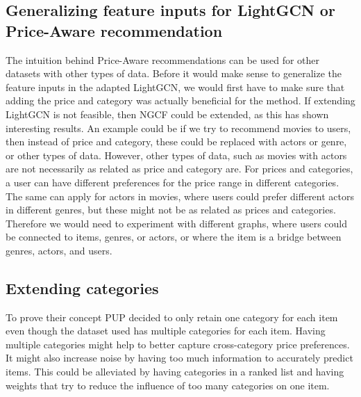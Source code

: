 \subsection{Generalizing feature inputs for LightGCN or Price-Aware recommendation}
The intuition behind Price-Aware recommendations can be used for other datasets with other types of data.
Before it would make sense to generalize the feature inputs in the adapted LightGCN, we would first have to make sure that adding the price and category was actually beneficial for the method.
If extending LightGCN is not feasible, then NGCF could be extended, as this has shown interesting results.
An example could be if we try to recommend movies to users, then instead of price and category, these could be replaced with actors or genre, or other types of data.
However, other types of data, such as movies with actors are not necessarily as related as price and category are.
For prices and categories, a user can have different preferences for the price range in different categories.
The same can apply for actors in movies, where users could prefer different actors in different genres, but these might not be as related as prices and categories.
Therefore we would need to experiment with different graphs, where users could be connected to items, genres, or actors, or where the item is a bridge between genres, actors, and users.

\subsection{Extending categories}
To prove their concept PUP decided to only retain one category for each item even though the dataset used has multiple categories for each item.
Having multiple categories might help to better capture cross-category price preferences.
It might also increase noise by having too much information to accurately predict items.
This could be alleviated by having categories in a ranked list and having weights that try to reduce the influence of too many categories on one item.
